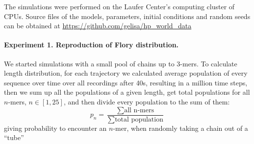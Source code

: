 \documentclass[journal=jacsat,manuscript=article,layout=twocolumn]{achemso}
\newcommand*{\ga}{\alpha}
\begin{document}
The simulations were performed on the Laufer Center's computing cluster of CPUs. 
Source files of the models, parameters, initial conditions and random seeds can be obtained at 
\url{https://github.com/gelisa/hp_world_data}

\paragraph{Experiment 1. Reproduction of Flory distribution.}\label{sec:expt1}
We started simulations with a small pool of chains up to 3-mers. To calculate length distribution, 
for each trajectory we calculated average population of every sequence over time over all 
recordings 
after 40s, resulting in a million time steps, then we sum up all the populations of a given length, 
get total populations for all $n$-mers, $n\in[1,25]$, and then divide every population to the sum 
of them:
\begin{equation}
 p_n = \frac{\sum\mbox{all n-mers}}{\sum\mbox{total population}}
\end{equation}
giving probability to encounter an $n$-mer, when randomly taking a chain out of a ``tube''
\end{document}
